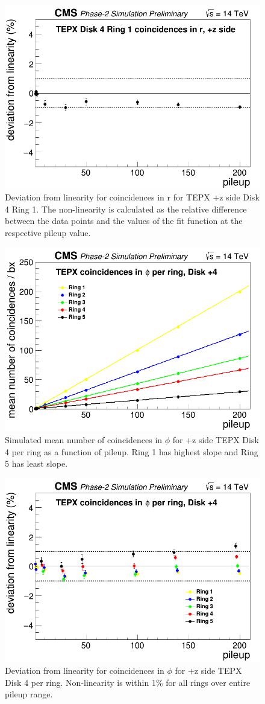 \begin{figure}[H]
  \centering
  \includegraphics[width=0.5\columnwidth]{./TEPX_Disk_4_Ring_1_coincidences_in_r__pz_side_mean_number_of_coincidences___bx_Linearity_residuals.png}
  \caption{Deviation from linearity for coincidences in r for TEPX +z side Disk 4 Ring 1. The non-linearity is calculated as the relative difference between the data points and the values of the fit function at the respective pileup value.}
  \label{fig:CMS}
\end{figure}



\begin{figure}[H]
  \centering
  \includegraphics[width=0.5\columnwidth]{./TEPX_coincidences_in_phi_per_ring_mean_number_of_coincidences___bxDisk4_Linearity.png}
  \caption{Simulated mean number of coincidences in $\phi$ for +z side TEPX Disk 4 per ring as a function of pileup. Ring 1 has highest slope and Ring 5 has least slope.}
  \label{fig:CMS}
\end{figure}



\begin{figure}[H]
  \centering
  \includegraphics[width=0.5\columnwidth]{./TEPX_coincidences_in_phi_per_ring_mean_number_of_coincidences___bxDisk4_Linearity_residuals.png}
  \caption{Deviation from linearity for coincidences in $\phi$ for +z side TEPX Disk 4 per ring. Non-linearity is within 1\% for all rings over entire pileup range.}
  \label{fig:CMS}
\end{figure}



